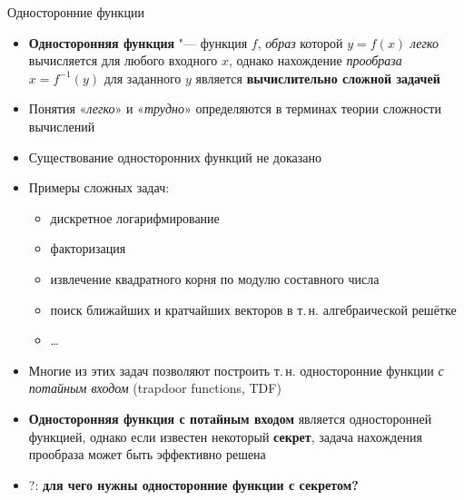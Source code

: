 \documentclass{ca-slides}
\begin{document}
\begin{canvasframe}{Односторонние функции}
  \small
  \begin{itemize}
    \item \textbf{Односторонняя функция} "--- функция $f$, \emph{образ} которой $y = f(x)$
      \emph{легко} вычисляется для любого входного $x$, однако нахождение \emph{прообраза}
      $x = f^{-1}(y)$ для заданного $y$ является \textbf{вычислительно сложной задачей}
    \item Понятия «\emph{легко}» и «\emph{трудно}» определяются в терминах теории сложности вычислений
    \item Существование односторонних функций не доказано
    \item Примеры сложных задач:
    \begin{itemize}
      \item дискретное логарифмирование
      \item факторизация
      \item извлечение квадратного корня по модулю составного числа
      \item поиск ближайших и кратчайших векторов в т.\,н. алгебраической решётке
      \item \ldots
    \end{itemize}
    \item Многие из этих задач позволяют построить т.\,н. односторонние функции
      \emph{с потайным входом} (trapdoor functions, TDF)
    \item \textbf{Односторонняя функция с потайным входом} является односторонней функцией,
      однако если известен некоторый \textbf{секрет}, задача нахождения прообраза может быть
      эффективно решена
    \item \alert{?}: \textbf{для чего нужны односторонние функции с секретом?}
  \end{itemize}
\end{canvasframe}
\end{document}
